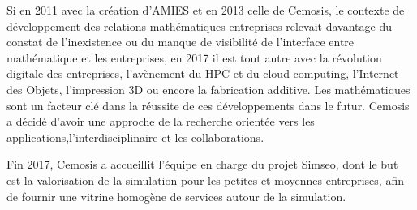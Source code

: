 Si en 2011 avec la création d'AMIES et en 2013 celle de Cemosis, le contexte de développement des relations mathématiques entreprises relevait davantage du constat de l'inexistence ou du manque de visibilité de l'interface entre mathématique et les entreprises, en 2017 il est tout autre avec la révolution digitale des entreprises, l'avènement du HPC et du cloud computing, l'Internet des Objets, l'impression 3D ou encore la fabrication additive. Les mathématiques sont un facteur clé dans la réussite de ces développements dans le futur. Cemosis a décidé d'avoir une approche de la recherche orientée vers les applications,l'interdisciplinaire et les collaborations.
 
 Fin 2017, Cemosis a accueillit l'équipe en charge du projet Simseo, dont le but est la valorisation de la simulation pour les petites et moyennes entreprises, afin de fournir une vitrine homogène de services autour de la simulation.

\vspace{1cm}